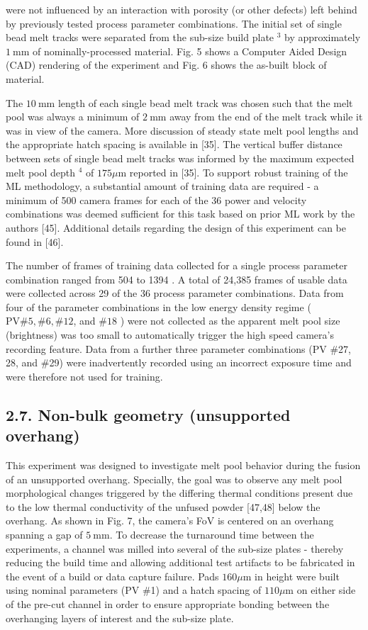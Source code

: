 \documentclass[10pt]{article}
\begin{document}
were not influenced by an interaction with porosity (or other defects) left behind by previously tested process parameter combinations. The initial set of single bead melt tracks were separated from the sub-size build plate ${ }^{3}$ by approximately $1 \mathrm{~mm}$ of nominally-processed material. Fig. 5 shows a Computer Aided Design (CAD) rendering of the experiment and Fig. 6 shows the as-built block of material.

The $10 \mathrm{~mm}$ length of each single bead melt track was chosen such that the melt pool was always a minimum of $2 \mathrm{~mm}$ away from the end of the melt track while it was in view of the camera. More discussion of steady state melt pool lengths and the appropriate hatch spacing is available in [35]. The vertical buffer distance between sets of single bead melt tracks was informed by the maximum expected melt pool depth $^{4}$ of $175 \mu \mathrm{m}$ reported in [35]. To support robust training of the ML methodology, a substantial amount of training data are required - a minimum of 500 camera frames for each of the 36 power and velocity combinations was deemed sufficient for this task based on prior ML work by the authors [45]. Additional details regarding the design of this experiment can be found in [46].

The number of frames of training data collected for a single process parameter combination ranged from 504 to 1394 . A total of 24,385 frames of usable data were collected across 29 of the 36 process parameter combinations. Data from four of the parameter combinations in the low energy density regime ( $\mathrm{PV} \# 5, \# 6, \# 12$, and $\# 18$ ) were not collected as the apparent melt pool size (brightness) was too small to automatically trigger the high speed camera's recording feature. Data from a further three parameter combinations (PV \#27, 28, and \#29) were inadvertently recorded using an incorrect exposure time and were therefore not used for training.

\subsection*{2.7. Non-bulk geometry (unsupported overhang)}
This experiment was designed to investigate melt pool behavior during the fusion of an unsupported overhang. Specially, the goal was to observe any melt pool morphological changes triggered by the differing thermal conditions present due to the low thermal conductivity of the unfused powder [47,48] below the overhang. As shown in Fig. 7, the camera's FoV is centered on an overhang spanning a gap of $5 \mathrm{~mm}$. To decrease the turnaround time between the experiments, a channel was milled into several of the sub-size plates - thereby reducing the build time and allowing additional test artifacts to be fabricated in the event of a build or data capture failure. Pads $160 \mu \mathrm{m}$ in height were built using nominal parameters (PV \#1) and a hatch spacing of $110 \mu \mathrm{m}$ on either side of the pre-cut channel in order to ensure appropriate bonding between the overhanging layers of interest and the sub-size plate.
\end{document}
